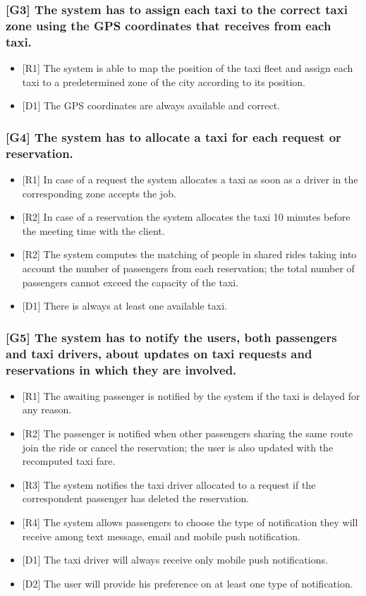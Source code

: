 \documentclass[a4paper,11pt]{report} %
\begin{document}
	\subsubsection{{[}G3{]} The system has to assign each taxi to the correct taxi zone using the GPS coordinates that receives from each taxi.}
	\begin{itemize}
		\item {[}R1{]} The system is able to map the position of the taxi fleet and assign each taxi to a predetermined zone of the city according to its position.
		\item {[}D1{]} The GPS coordinates are always available and correct.
	\end{itemize}
	
	\subsubsection{{[}G4{]} The system has to allocate a taxi for each request or reservation.}
	\begin{itemize}
		\item {[}R1{]} In case of a request the system allocates a taxi as soon as a driver in the corresponding zone accepts the job.
		\item {[}R2{]} In case of a reservation the system allocates the taxi 10 minutes before the meeting time with the client.
		\item {[}R2{]} The system computes the matching of people in shared rides taking into account the number of passengers from each reservation; the total number of passengers cannot exceed the capacity of the taxi.
		\item {[}D1{]} There is always at least one available taxi.
	\end{itemize}
		
	\subsubsection{{[}G5{]} The system has to notify the users, both passengers and taxi drivers, about updates on taxi requests and reservations in which they are involved.}
	\begin{itemize}
		\item {[}R1{]} The awaiting passenger is notified by the system if the taxi is delayed for any reason.
		\item {[}R2{]} The passenger is notified when other passengers sharing the same route join the ride or cancel the reservation; the user is also updated with the recomputed taxi fare.
		\item {[}R3{]} The system notifies the taxi driver allocated to a request if the correspondent passenger has deleted the reservation.
		\item {[}R4{]} The system allows passengers to choose the type of notification they will receive among text message, email and mobile push notification.
		\item {[}D1{]} The taxi driver will always receive only mobile push notifications.
		\item {[}D2{]} The user will provide his preference on at least one type of notification.
	\end{itemize}
		
\end{document}
